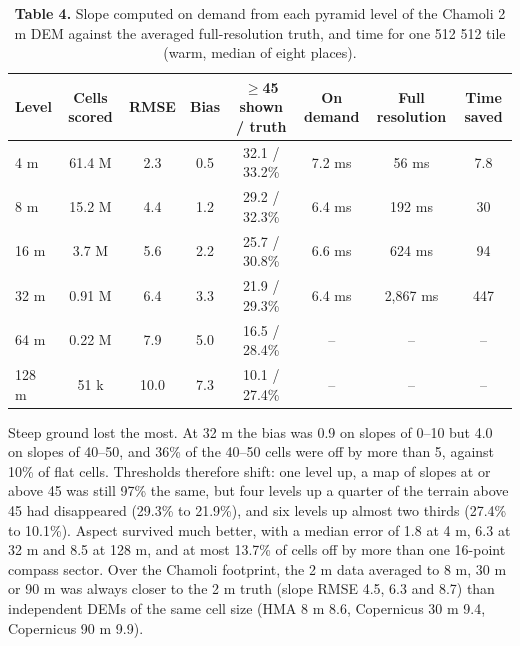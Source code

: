 \documentclass[10pt,a4paper]{article}
\begin{document}
\begin{table}[H]
\centering\small
\caption*{\textbf{Table 4.} Slope computed on demand from each pyramid level of the Chamoli 2 m DEM against the averaged full-resolution truth, and time for one 512 \texttimes{} 512 tile (warm, median of eight places).}
\begin{tabular*}{\linewidth}{@{\extracolsep{\fill}}lccccccc}
\toprule
\textbf{Level} & \textbf{Cells scored} & \textbf{RMSE} & \textbf{Bias} & \textbf{$\geq$45\textdegree{} shown / truth} & \textbf{On demand} & \textbf{Full resolution} & \textbf{Time saved} \\
\midrule
4 m & 61.4 M & 2.3\textdegree{} & \textminus{}0.5\textdegree{} & 32.1 / 33.2\% & 7.2 ms & 56 ms & 7.8\texttimes{} \\
8 m & 15.2 M & 4.4\textdegree{} & \textminus{}1.2\textdegree{} & 29.2 / 32.3\% & 6.4 ms & 192 ms & 30\texttimes{} \\
16 m & 3.7 M & 5.6\textdegree{} & \textminus{}2.2\textdegree{} & 25.7 / 30.8\% & 6.6 ms & 624 ms & 94\texttimes{} \\
32 m & 0.91 M & 6.4\textdegree{} & \textminus{}3.3\textdegree{} & 21.9 / 29.3\% & 6.4 ms & 2,867 ms & 447\texttimes{} \\
64 m & 0.22 M & 7.9\textdegree{} & \textminus{}5.0\textdegree{} & 16.5 / 28.4\% & -- & -- & -- \\
128 m & 51 k & 10.0\textdegree{} & \textminus{}7.3\textdegree{} & 10.1 / 27.4\% & -- & -- & -- \\
\bottomrule
\end{tabular*}
\par{}
\end{table}
Steep ground lost the most. At 32 m the bias was \textminus{}0.9\textdegree{} on slopes of 0--10\textdegree{} but \textminus{}4.0\textdegree{} on slopes of 40--50\textdegree{}, and 36\% of the 40--50\textdegree{} cells were off by more than 5\textdegree{}, against 10\% of flat cells. Thresholds therefore shift: one level up, a map of slopes at or above 45\textdegree{} was still 97\% the same, but four levels up a quarter of the terrain above 45\textdegree{} had disappeared (29.3\% to 21.9\%), and six levels up almost two thirds (27.4\% to 10.1\%). Aspect survived much better, with a median error of 1.8\textdegree{} at 4 m, 6.3\textdegree{} at 32 m and 8.5\textdegree{} at 128 m, and at most 13.7\% of cells off by more than one 16-point compass sector. Over the Chamoli footprint, the 2 m data averaged to 8 m, 30 m or 90 m was always closer to the 2 m truth (slope RMSE 4.5\textdegree{}, 6.3\textdegree{} and 8.7\textdegree{}) than independent DEMs of the same cell size (HMA 8 m 8.6\textdegree{}, Copernicus 30 m 9.4\textdegree{}, Copernicus 90 m 9.9\textdegree{}).
\end{document}
